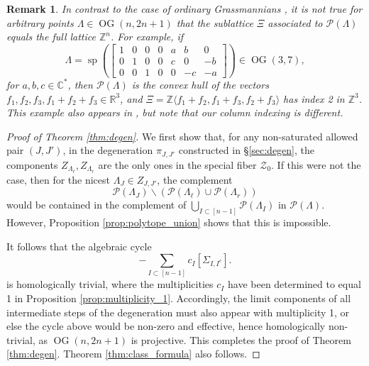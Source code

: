 \documentclass[12pt]{amsart}
\newtheorem{remark}[definition]{Remark}
\DeclareMathOperator{\OG}{OG}
\DeclareMathOperator{\ssp}{sp}
\newcommand{\bC}{\mathbb{C}}
\newcommand{\cP}{\mathcal{P}}
\newcommand{\bR}{\mathbb{R}}
\newcommand{\bZ}{\mathbb{Z}}
\newcommand{\cZ}{\mathcal{Z}}
\begin{document}
\begin{remark}\label{rem:not_always_reduced}
    In contrast to the case of ordinary Grassmannians \cite[Proposition 1.2.15]{kapranov}, it is not true for arbitrary points $\Lambda\in\OG(n,2n+1)$ that the sublattice $\Xi$ associated to $\cP(\Lambda)$ equals the full lattice $\bZ^n$. For example, if
    \begin{equation*}
        \Lambda=\ssp\left(
        \begin{bmatrix}
            1 & 0 & 0 & 0 & a & b & 0 \\
            0 & 1 & 0 & 0 & c & 0 & -b\\
            0 & 0 & 1 & 0 & 0 & -c & -a
        \end{bmatrix}
        \right)\in\OG(3,7),
    \end{equation*}
    for $a,b,c\in\bC^{*}$, then $\cP(\Lambda)$ is the convex hull of the vectors $f_1,f_2,f_3,f_1+f_2+f_3\in\bR^3$, and $\Xi=\bZ\langle f_1+f_2,f_1+f_3,f_2+f_3\rangle$ has index 2 in $\bZ^3$. This example also appears in \cite[Example 5.1]{els}, but note that our column indexing is different.
\end{remark}

\begin{proof}[Proof of Theorem \ref{thm:degen}]
We first show that, for any non-saturated allowed pair $(J,J')$, in the degeneration $\pi_{J,J'}$ constructed in \S\ref{sec:degen}, the components $Z_{\Lambda_\ell},Z_{\Lambda_r}$ are the only ones in the special fiber $\cZ_0$. If this were not the case, then for the nicest $\Lambda_J\in Z_{J,J'}$, the complement
\begin{equation*}
    \cP(\Lambda_J)\backslash(\cP(\Lambda_\ell)\cup\cP(\Lambda_r))
\end{equation*}
would be contained in the complement of $\bigcup_{I\subset[n-1]}\cP(\Lambda_{I})$ in $\cP(\Lambda)$. However, Proposition \ref{prop:polytope_union} shows that this is impossible.

It follows that the algebraic cycle
\begin{equation*}
    [Z_\Lambda]-\sum_{I\subset [n-1]} c_I[\Sigma_{I,I^c}].
\end{equation*}
is homologically trivial, where the multiplicities $c_I$ have been determined to equal 1 in Proposition \ref{prop:multiplicity_1}. Accordingly, the limit components of all intermediate steps of the degeneration must also appear with multiplicity 1, or else the cycle above would be non-zero and effective, hence homologically non-trivial, as $\OG(n,2n+1)$ is projective. This completes the proof of Theorem \ref{thm:degen}. Theorem \ref{thm:class_formula} also follows.
\end{proof}
\end{document}
